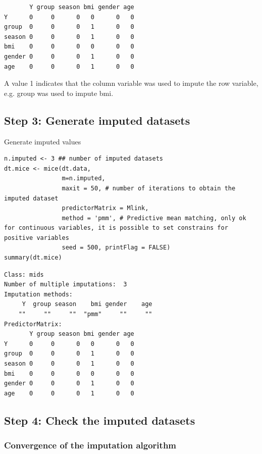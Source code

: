\documentclass[12pt]{article}
\begin{document}
\begin{verbatim}
       Y group season bmi gender age
Y      0     0      0   0      0   0
group  0     0      0   1      0   0
season 0     0      0   1      0   0
bmi    0     0      0   0      0   0
gender 0     0      0   1      0   0
age    0     0      0   1      0   0
\end{verbatim}

A value 1 indicates that the column variable was used to impute the
row variable, e.g. group was used to impute bmi.

\clearpage

\subsection{Step 3: Generate imputed datasets}
\label{sec:orgf7a6599}
Generate imputed values
\lstset{language=r,label= ,caption= ,captionpos=b,numbers=none}
\begin{lstlisting}
n.imputed <- 3 ## number of imputed datasets
dt.mice <- mice(dt.data,
				m=n.imputed, 
				maxit = 50, # number of iterations to obtain the imputed dataset
				predictorMatrix = Mlink,
				method = 'pmm', # Predictive mean matching, only ok for continuous variables, it is possible to set constrains for positive variables
				seed = 500, printFlag = FALSE)
summary(dt.mice)
\end{lstlisting}

\begin{verbatim}
Class: mids
Number of multiple imputations:  3 
Imputation methods:
     Y  group season    bmi gender    age 
    ""     ""     ""  "pmm"     ""     "" 
PredictorMatrix:
       Y group season bmi gender age
Y      0     0      0   0      0   0
group  0     0      0   1      0   0
season 0     0      0   1      0   0
bmi    0     0      0   0      0   0
gender 0     0      0   1      0   0
age    0     0      0   1      0   0
\end{verbatim}

\clearpage

\subsection{Step 4: Check the imputed datasets}
\label{sec:org07beeaf}
\subsubsection{Convergence of the imputation algorithm}
\label{sec:orgc3dd8f3}
\end{document}
